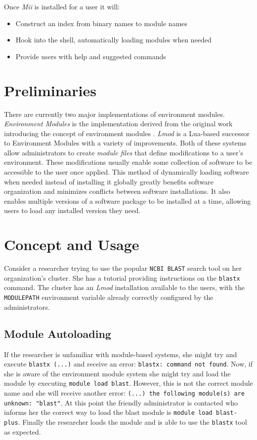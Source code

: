 \documentclass[manuscript,screen]{acmart}
\begin{document}
Once \textit{Mii} is installed for a user it will:
\begin{itemize}
\item Construct an index from binary names to module names
\item Hook into the shell, automatically loading modules when needed
\item Provide users with help and suggested commands
\end{itemize}

\section{Preliminaries}

There are currently two major implementations of environment modules. \textit{Environment Modules} \cite{TclPage} is
the implementation derived from the original work introducing the concept of environment modules \cite{TclPaper}.
\textit{Lmod} \cite{LmodPage} is a Lua-based successor to Environment Modules with a variety of improvements. Both of these
systems allow administrators to create \textit{module files} that define modifications to a user’s environment. These
modifications usually enable some collection of software to be accessible to the user once applied. This
method of dynamically loading software when needed instead of installing it globally greatly benefits software
organization and minimizes conflicts between software installations. It also enables multiple versions of a
software package to be installed at a time, allowing users to load any installed version they need.

\section{Concept and Usage}

Consider a researcher trying to use the popular \texttt{NCBI BLAST} search tool on her organization’s cluster. She
has a tutorial providing instructions on the \texttt{blastx} command. The cluster has an \textit{Lmod} installation
available to the users, with the \texttt{MODULEPATH} environment variable already correctly configured by the administrators.

\subsection{Module Autoloading}

If the researcher is unfamiliar with module-based systems, she might try and execute \texttt{blastx (...)} and
receive an error: \texttt{blastx: command not found}. Now, if she is aware of the environment module system she
might try and load the module by executing \texttt{module load blast}. However, this is not the correct module
name and she will receive another error: \texttt{(...) the following module(s) are unknown: "blast"}. At this
point the friendly administrator is contacted who informs her the correct way to load the blast module is
\texttt{module load blast-plus}. Finally the researcher loads the module and is able to use the \texttt{blastx} tool as
expected.
\end{document}

